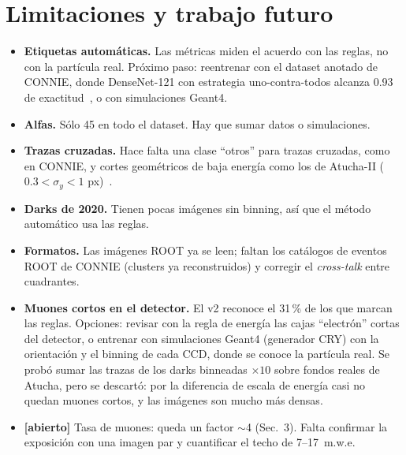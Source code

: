 \documentclass[10pt,a4paper]{article}
\newcommand{\abierto}[1]{\textcolor{orange!80!black}{\textbf{[abierto]} #1}}
\begin{document}
\section{Limitaciones y trabajo futuro}
\begin{itemize}
\item \textbf{Etiquetas automáticas.} Las métricas miden el acuerdo con las reglas, no con la partícula
  real. Próximo paso: reentrenar con el dataset anotado de CONNIE, donde DenseNet-121 con estrategia
  uno-contra-todos alcanza 0.93 de exactitud~\cite{mirthis2026}, o con simulaciones Geant4.
\item \textbf{Alfas.} Sólo 45 en todo el dataset. Hay que sumar datos o simulaciones.
\item \textbf{Trazas cruzadas.} Hace falta una clase ``otros'' para trazas cruzadas, como en CONNIE, y
  cortes geométricos de baja energía como los de Atucha-II ($0.3<\sigma_y<1$ px)~\cite{depaoli2024}.
\item \textbf{Darks de 2020.} Tienen pocas imágenes sin binning, así que el método automático usa las reglas.
\item \textbf{Formatos.} Las imágenes ROOT ya se leen; faltan los catálogos de eventos ROOT de CONNIE (clusters
  ya reconstruidos) y corregir el \emph{cross-talk} entre cuadrantes.
\item \textbf{Muones cortos en el detector.} El v2 reconoce el 31\,\% de los que marcan las reglas. Opciones:
  revisar con la regla de energía las cajas ``electrón'' cortas del detector, o entrenar con simulaciones
  Geant4 (generador CRY) con la orientación y el binning de cada CCD, donde se conoce la partícula real.
  Se probó sumar las trazas de los darks binneadas $\times10$ sobre fondos reales de Atucha, pero se descartó:
  por la diferencia de escala de energía casi no quedan muones cortos, y las imágenes son mucho más densas.
\item \abierto{Tasa de muones: queda un factor $\sim$4 (Sec.~3). Falta confirmar la exposición con una imagen par
  y cuantificar el techo de 7--17~m.w.e.}
\end{itemize}

\end{document}
